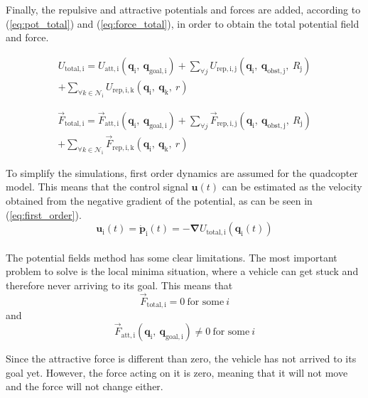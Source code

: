 \documentclass[journal, twoside]{IEEEtran}
\newcommand*{\subb}[1]{_{\mathrm{#1}}}
\begin{document}
		Finally, the repulsive and attractive potentials and forces are added, according to (\ref{eq:pot_total}) and (\ref{eq:force_total}), in order to obtain the total potential field and force. 
		
		\begin{multline} \label{eq:pot_total}
		U\subb{total, i} = U\subb{att, i}(\bm{q}\subb{i}, \ \bm{q}\subb{goal, i}) + \sum \limits_{\forall j}U\subb{rep,i,j} (\bm{q}\subb{i}, \ \bm{q}\subb{obst, j},\ R\subb{j}) \\ + \sum \limits_{\forall k \in \mathcal{N}\subb{i}}U\subb{rep,i,k}(\bm{q}\subb{i}, \ \bm{q}\subb{k},\ r)
		\end{multline}
		
		\begin{multline} \label{eq:force_total}
		\vec{F}\subb{total, i} = \vec{F}\subb{att,i}(\bm{q}\subb{i}, \ \bm{q}\subb{goal, i}) + \sum\limits_{\forall j} \vec{F}\subb{rep,i,j}(\bm{q}\subb{i}, \ \bm{q}\subb{obst, j},\ R\subb{j}) \\ + \sum\limits_{\forall k \in \mathcal{N}\subb{i}} \vec{F}\subb{rep,i,k}(\bm{q}\subb{i}, \ \bm{q}\subb{k},\ r)
		\end{multline}
		
		
		To simplify the simulations, first order dynamics are assumed for the quadcopter model. This means that the control signal $\bm{u}(t)$ can be estimated as the velocity obtained from the negative gradient of the potential, as can be seen in (\ref{eq:first_order}).
		\begin{equation} \label{eq:first_order}
		\bm{u}\subb{i}(t) = \bm{\dot p}\subb{i}(t) = -\bm{\nabla}U\subb{total, i}(\bm{q}\subb{i}(t))
		\end{equation}
		\\
		The potential fields method has some clear limitations. The most important problem to solve is the local minima situation, where a vehicle can get stuck and therefore never arriving to its goal. This means that 
		\begin{equation} 
			\vec{F}\subb{total, i} = 0 \ \textrm{for some} \ i
		\end{equation}
		and
		\begin{equation} 
			\vec{F}\subb{att,i}(\bm{q}\subb{i}, \ \bm{q}\subb{goal, i}) \neq 0  \ \textrm{for some} \ i
		\end{equation}
		
		Since the attractive force is different than zero, the vehicle has not arrived to its goal yet. However, the force acting on it is zero, meaning that it will not move and the force will not change either. \\
		
\end{document}
